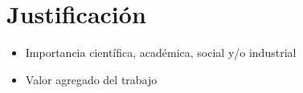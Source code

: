 \chapter{Justificación} 
\begin{itemize}
    \item Importancia científica, académica, social y/o industrial
    \item Valor agregado del trabajo

\end{itemize}